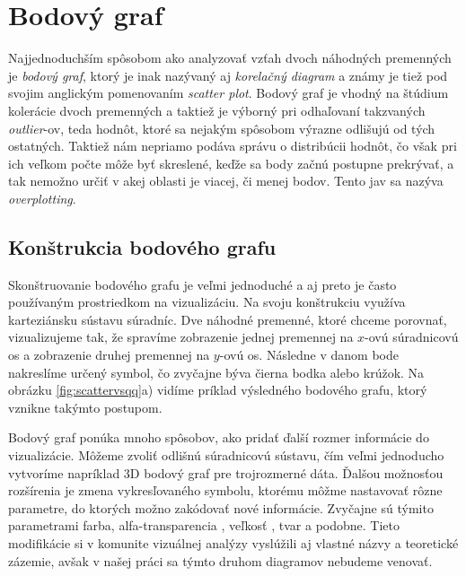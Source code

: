 \label{sec:prevvis}

\section{Bodový graf}
\label{subsec:scatterplot}
Najjednoduchším spôsobom ako analyzovať vzťah dvoch náhodných premenných je \textit{bodový graf}, ktorý je inak nazývaný aj \textit{korelačný diagram} a známy je tiež pod svojim anglickým pomenovaním \textit{scatter plot}. Bodový graf je vhodný na štúdium kolerácie dvoch premenných a taktiež je výborný pri odhaľovaní takzvaných \mbox{\textit{outlier}-ov}, teda hodnôt, ktoré sa nejakým spôsobom výrazne odlišujú od tých ostatných. Taktiež nám nepriamo podáva správu o distribúcii hodnôt, čo však pri ich veľkom počte môže byť skreslené, keďže sa body začnú postupne prekrývať, a tak nemožno určiť v akej oblasti je viacej, či menej bodov. Tento jav sa nazýva \textit{overplotting}.


\subsection{Konštrukcia bodového grafu}
Skonštruovanie bodového grafu je veľmi jednoduché a aj preto je často používaným prostriedkom na vizualizáciu. Na svoju konštrukciu využíva karteziánsku sústavu súradníc. Dve náhodné premenné, ktoré chceme porovnať, vizualizujeme tak, že spravíme zobrazenie jednej premennej na \mbox{$ x $-ovú} súradnicovú os a zobrazenie druhej premennej na \mbox{$ y $-ovú} os. Následne v danom bode nakreslíme určený symbol, čo zvyčajne býva čierna bodka alebo krúžok. 
Na obrázku \ref{fig:scattervsqq}a) vidíme príklad výsledného bodového grafu, ktorý vznikne takýmto postupom.

Bodový graf ponúka mnoho spôsobov, ako pridať ďalší rozmer informácie do vizualizácie. Môžeme zvoliť odlišnú súradnicovú sústavu, čím veľmi jednoducho vytvoríme napríklad 3D bodový graf pre trojrozmerné dáta. Ďalšou možnosťou rozšírenia je zmena vykresľovaného symbolu, ktorému môžme nastavovať rôzne parametre, do ktorých možno zakódovať nové informácie. Zvyčajne sú týmito parametrami farba, \mbox{alfa-transparencia} \cite{SolutionToOverplotting}, veľkosť \cite{Viegas}, tvar \cite{GenSensScatterplot, EnhanceScatterplot} a podobne. Tieto modifikácie si v komunite vizuálnej analýzy vyslúžili aj vlastné názvy a teoretické zázemie, avšak v našej práci sa týmto druhom diagramov nebudeme venovať.

